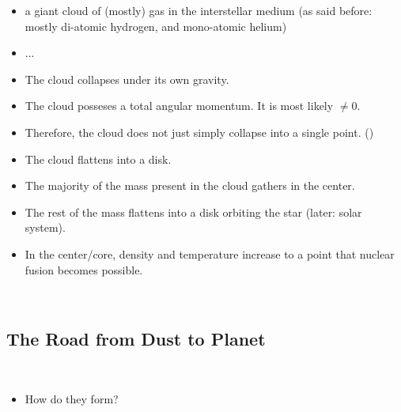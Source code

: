         \begin{itemize}
            \item a giant cloud of (mostly) gas in the interstellar medium 
                  (as said before: mostly di-atomic hydrogen, and mono-atomic helium)
        \end{itemize}
        \begin{itemize}
            \item ...
        \end{itemize}
        \begin{itemize}
            \item The cloud collapses under its own gravity. 
            \item The cloud posseses a total angular momentum. It is most likely $\neq 0$.
            \item Therefore, the cloud does not just simply collapse into a single point. 
                  ()
            \item The cloud flattens into a disk.
            \item The majority of the mass present in the cloud gathers in the center.
            \item The rest of the mass flattens into a disk orbiting the star 
                  (later: solar system).
            \item In the center/core, density and temperature increase to a point that nuclear 
                  fusion becomes possible.
        \end{itemize}

         \\

    \subsection{The Road from Dust to Planet}

         \\

        \begin{itemize}
            \item How do they form?
        \end{itemize}

